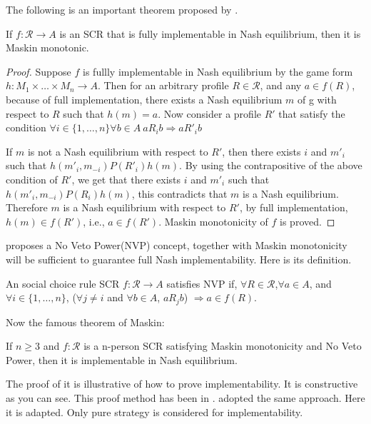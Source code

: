 The following  is an important theorem proposed by \parencite{Maskin1999}.


\begin{thm}
If $f: \mathscr{R} \rightarrow A$ is an SCR that is fully implementable in
Nash equilibrium, then it is Maskin monotonic.
\end{thm}
\begin{proof}
Suppose $f$ is fullly implementable in Nash equilibrium by the game form $h:
M_1\times \dots \times M_n \rightarrow A$.  Then for an arbitrary
profile $R \in \mathscr{R}$, and any $a \in f(R)$, because of full
implementation, there exists a Nash equilibrium $m$ of g with respect
to $R$ such that $h(m) = a$. Now consider a profile $R'$ that satisfy
the condition $\forall i \in \{1, \dots, n\} \forall b \in A  \  aR_i b \Rightarrow
aR'_i b$

If $m$ is not a Nash equilibrium with respect to $R'$,  then there
exists $i$ and $m'_i$ such that $h(m'_i, m_{-i}) P(R'_i) h(m) $. By
using the contrapositive of the above condition of $R'$, we get that there
exists $i$ and $m'_i$ such that $h(m'_i, m_{-i}) P(R_i) h(m) $, this
contradicts that $m$ is a Nash equilibrium. 
Therefore $m$ is a Nash equilibrium with respect to $R'$, by full
implementation, $h(m) \in f(R')$, i.e., $a \in f(R')$. Maskin
monotonicity of $f$ is proved.


\end{proof}

\parencite{Maskin1999} proposes a No Veto Power(NVP) concept, together with
Maskin monotonicity will be sufficient to guarantee full Nash
implementability. Here is its definition.

\begin{definition}
An social choice rule SCR $f:\mathscr{R} \rightarrow A$ satisfies NVP
if,
$\forall R \in \mathscr{R}$,$\forall a \in A$, and $\forall i \in
\{1,\dots, n\}$, 
($\forall j \not = i$ and $\forall b \in A$, $a R_j
b$) $\Rightarrow a \in f(R)$.
\end{definition}

Now the famous theorem of Maskin:
\begin{thm}
If $n\geq 3$ and $f: \mathscr{R}$ is a  n-person SCR satisfying Maskin
monotonicity and No Veto Power,  then it is implementable in Nash equilibrium.
\end{thm}

The proof of it is illustrative of how to prove implementability. It
is constructive as you can see. This proof method has been
in \parencite{Repullo90}.  \parencite{Maskin1999} adopted the same
approach. Here it is adapted. Only pure strategy is considered for implementability.

